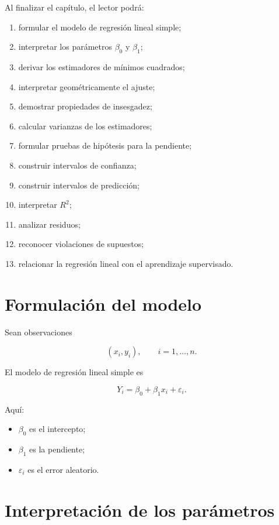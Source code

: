 \documentclass[
  spanish,
  11pt,
  letterpaper,
  DIV=11,
  numbers=noendperiod]{scrreprt}
\providecommand{\tightlist}{%
  \setlength{\itemsep}{0pt}\setlength{\parskip}{0pt}}
\theoremstyle{definition}
\theoremstyle{plain}
\theoremstyle{definition}
\theoremstyle{remark}
\begin{document}
Al finalizar el capítulo, el lector podrá:

\begin{enumerate}
\def\labelenumi{\arabic{enumi}.}
\tightlist
\item
  formular el modelo de regresión lineal simple;
\item
  interpretar los parámetros \(\beta_0\) y \(\beta_1\);
\item
  derivar los estimadores de mínimos cuadrados;
\item
  interpretar geométricamente el ajuste;
\item
  demostrar propiedades de insesgadez;
\item
  calcular varianzas de los estimadores;
\item
  formular pruebas de hipótesis para la pendiente;
\item
  construir intervalos de confianza;
\item
  construir intervalos de predicción;
\item
  interpretar \(R^2\);
\item
  analizar residuos;
\item
  reconocer violaciones de supuestos;
\item
  relacionar la regresión lineal con el aprendizaje supervisado.
\end{enumerate}

\section{Formulación del modelo}\label{formulaciuxf3n-del-modelo}

Sean observaciones

\[
(x_i,y_i),
\qquad
i=1,\ldots,n.
\]

El modelo de regresión lineal simple es

\[
Y_i
=
\beta_0
+
\beta_1x_i
+
\varepsilon_i.
\]

Aquí:

\begin{itemize}
\tightlist
\item
  \(\beta_0\) es el intercepto;
\item
  \(\beta_1\) es la pendiente;
\item
  \(\varepsilon_i\) es el error aleatorio.
\end{itemize}

\section{Interpretación de los
parámetros}\label{interpretaciuxf3n-de-los-paruxe1metros}
\end{document}
